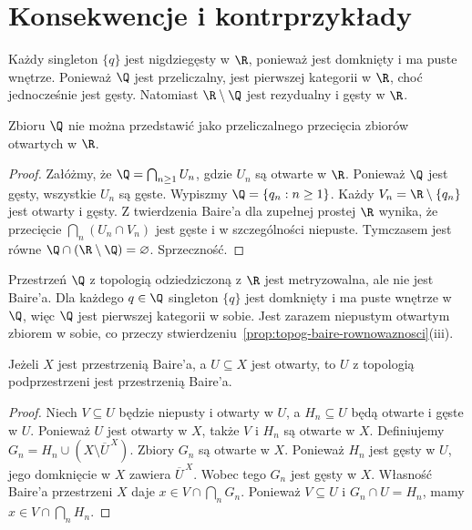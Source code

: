 \section{Konsekwencje i kontrprzykłady}
\label{sec:topog-baire-przyklady}

\begin{przyklad}
\label{ex:topog-baire-wymierne}
Każdy singleton $\{q\}$ jest nigdziegęsty
w $\R$, ponieważ jest domknięty i ma puste wnętrze.
Ponieważ $\Q$ jest przeliczalny, jest pierwszej
kategorii w $\R$, choć jednocześnie jest gęsty.
Natomiast $\R\setminus\Q$ jest rezydualny
i gęsty w $\R$.
\end{przyklad}

\begin{twierdzenie}
\label{thm:topog-baire-wymierne-nie-gdelta}
Zbioru $\Q$ nie można przedstawić jako
przeliczalnego przecięcia zbiorów otwartych w $\R$.
\end{twierdzenie}
\begin{proof}
Załóżmy, że $\Q=\bigcap_{n\ge1}U_n$,
gdzie $U_n$ są otwarte w $\R$.
Ponieważ $\Q$ jest gęsty, wszystkie $U_n$
są gęste. Wypiszmy $\Q=\{q_n:n\ge1\}$.
Każdy $V_n=\R\setminus\{q_n\}$ jest
otwarty i gęsty. Z twierdzenia Baire'a
dla zupełnej prostej $\R$ wynika,
że przecięcie $\bigcap_n(U_n\cap V_n)$
jest gęste i w szczególności niepuste.
Tymczasem jest równe
$\Q\cap(\R\setminus\Q)=\varnothing$.
Sprzeczność.
\end{proof}

\begin{przyklad}
\label{ex:topog-baire-q-nie-baire}
Przestrzeń $\Q$ z topologią odziedziczoną
z $\R$ jest metryzowalna, ale nie jest Baire'a.
Dla każdego $q\in\Q$ singleton $\{q\}$
jest domknięty i ma puste wnętrze w $\Q$,
więc $\Q$ jest pierwszej kategorii w sobie.
Jest zarazem niepustym otwartym zbiorem
w sobie, co przeczy
stwierdzeniu~\ref{prop:topog-baire-rownowaznosci}(iii).
\end{przyklad}

\begin{stwierdzenie}
\label{prop:topog-baire-otwarte-podprzestrzenie}
Jeżeli $X$ jest przestrzenią Baire'a,
a $U\subseteq X$ jest otwarty,
to $U$ z topologią podprzestrzeni
jest przestrzenią Baire'a.
\end{stwierdzenie}
\begin{proof}
Niech $V\subseteq U$ będzie niepusty i otwarty
w $U$, a $H_n\subseteq U$ będą otwarte i gęste w $U$.
Ponieważ $U$ jest otwarty w $X$, także $V$
i $H_n$ są otwarte w $X$. Definiujemy
$G_n=H_n\cup(X\setminus\overline U^{\,X})$.
Zbiory $G_n$ są otwarte w $X$.
Ponieważ $H_n$ jest gęsty w $U$,
jego domknięcie w $X$ zawiera $\overline U^{\,X}$.
Wobec tego $G_n$ jest gęsty w $X$.
Własność Baire'a przestrzeni $X$ daje
$x\in V\cap\bigcap_nG_n$.
Ponieważ $V\subseteq U$ i $G_n\cap U=H_n$,
mamy $x\in V\cap\bigcap_nH_n$.
\end{proof}

